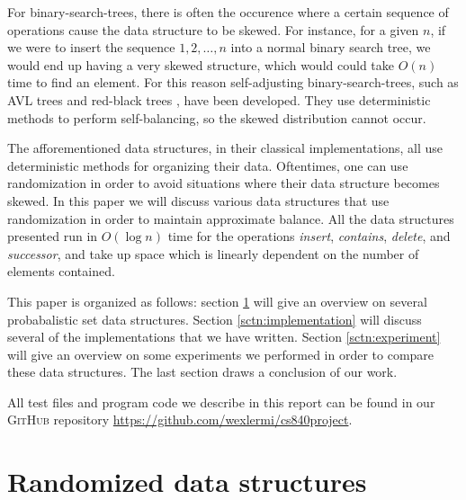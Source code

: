 \documentclass[oribibl]{llncs}
\begin{document}
For binary-search-trees, there is often the occurence where a certain sequence of operations cause the data structure to be skewed. For instance, for a given $n$, if we were to insert the sequence $1, 2, \dots, n$ into a normal binary search tree, we would end up having a very skewed structure, which would could take $O(n)$ time to find an element. For this reason self-adjusting binary-search-trees, such as AVL trees \cite{avl_tree} and red-black trees \cite{red_black_trees}, have been developed. They use deterministic methods to perform self-balancing, so the skewed distribution cannot occur.

The afforementioned data structures, in their classical implementations, all use deterministic methods for organizing their data.  Oftentimes, one can use randomization in order to avoid situations where their data structure becomes skewed. In this paper we will discuss various data structures that use randomization in order to maintain approximate balance. All the data structures presented run in $O(\log{n})$ time for the operations {\it insert}, {\it contains}, {\it delete}, and {\it successor}, and take up space which is linearly dependent on the number of elements contained.

This paper is organized as follows: section \ref{sctn:randomized_data_structures} will give an overview on several probabalistic set data structures. Section \ref{sctn:implementation} will discuss several of the implementations that we have written. Section \ref{sctn:experiment} will give an overview on some experiments we performed in order to compare these data structures. The last section draws a conclusion of our work.

All test files and program code we describe in this report can be found in our \textsc{GitHub} repository \url{https://github.com/wexlermi/cs840project}.


\section{Randomized data structures}
\label{sctn:randomized_data_structures}
\end{document}

